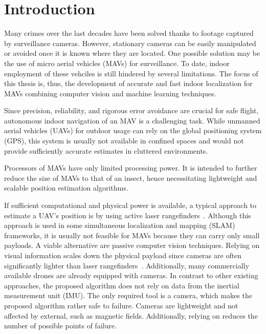 \chapter{Introduction}
\label{chap:introduction}

Many crimes over the last decades have been solved thanks to footage
captured by surveillance cameras. However, stationary cameras can be
easily manipulated or avoided once it is known where they are
located. One possible solution may be the use of micro aerial vehicles
(MAVs) for surveillance. To date, indoor employment of these vehciles
is still hindered by several limitations. The focus of this thesis is,
thus, the development of accurate and fast indoor localization for
MAVs combining computer vision and machine learning techniques.

Since precision, reliability, and rigorous error avoidance are crucial
for safe flight, autonomous indoor navigation of an MAV is a
challenging task. While unmanned aerial vehicles (UAVs) for
outdoor usage can rely on the global positioning system (GPS), this system is
usually not available in confined spaces and would not provide
sufficiently accurate estimates in cluttered environments.


Processors of MAVs have only limited processing power. It is intended to further reduce the size of MAVs to that of an
insect, hence necessitating lightweight and scalable position
estimation algorithms.

If sufficient computational and physical power is available, a typical
approach to estimate a UAV's position is by using active laser
rangefinders~\cite{grzonka2009towards,bachrach2009autonomous}.
Although this approach is used in some simultaneous localization and
mapping (SLAM) frameworks, it is usually not feasible for MAVs because
they can carry only small payloads. A viable alternative are passive
computer vision techniques. Relying on visual information scales down
the physical payload since cameras are often significantly lighter
than laser
rangefinders~\cite{blosch2010vision,angeli20062d,ahrens2009vision}.
Additionally, many commercially available drones are already equipped
with cameras. In contrast to other existing approaches, the proposed algorithm does not rely on data from the inertial measurement unit (IMU). The only required tool is a camera, which makes the proposed algorithm rather safe to failure. Cameras are lightweight and not affected by external, such as magnetic fields. Additionally, relying on reduces the number of possible points of failure.  

